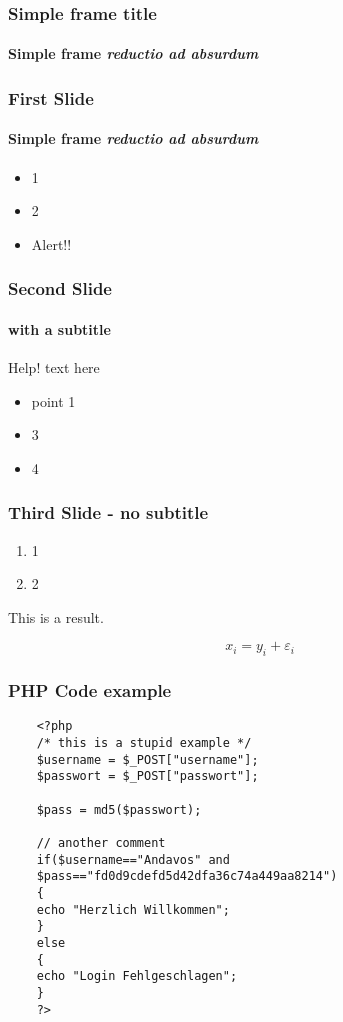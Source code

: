 \documentclass{beamer}
\begin{document}
\begin{frame}[plain]
	\titlepage{}
\end{frame}

\begin{frame}[allowframebreaks]
	\frametitle{Simple frame title}
	\framesubtitle{Simple frame \textit{reductio ad absurdum}}
\end{frame}

\begin{frame}
	\frametitle{First Slide}
	\framesubtitle{Simple frame \textit{reductio ad absurdum}}
	\begin{itemize}
		\item 1
		\item 2
		      \pause%
		\item \alert{Alert!!}
	\end{itemize}
\end{frame}

\begin{frame}
	\frametitle{Second Slide}
	\framesubtitle{with a subtitle}
	\begin{alertblock}{Help!}
		text here
		\begin{itemize}
			\item point 1
		\end{itemize}
	\end{alertblock}

	\begin{example}
		\begin{itemize}
			\item 3
			\item 4
		\end{itemize}
	\end{example}
\end{frame}

\begin{frame}
	\frametitle{Third Slide - no subtitle}
	\begin{enumerate}
		\item 1
		\item 2
	\end{enumerate}
	\begin{theorem}
		This is a result.
	\end{theorem}

	\[
		x_i = y_i + \varepsilon_i
	\]
\end{frame}

\begin{frame}[fragile]
	\frametitle{PHP Code example}
	\begin{lstlisting}
    <?php
    /* this is a stupid example */
    $username = $_POST["username"];
    $passwort = $_POST["passwort"];

    $pass = md5($passwort);

    // another comment
    if($username=="Andavos" and
    $pass=="fd0d9cdefd5d42dfa36c74a449aa8214")
    {
    echo "Herzlich Willkommen";
    }
    else
    {
    echo "Login Fehlgeschlagen";
    }
    ?>
    \end{lstlisting}
\end{frame}
\end{document}
